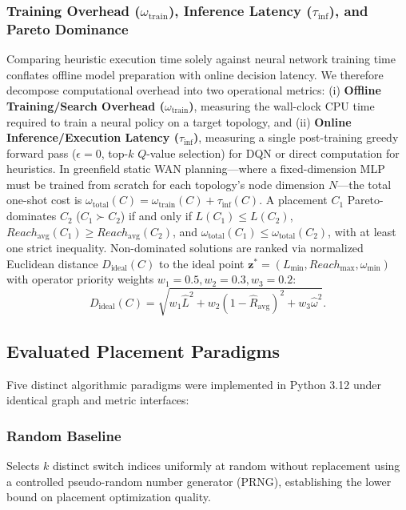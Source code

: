 \documentclass[conference]{IEEEtran}
\begin{document}
\subsubsection{Training Overhead ($\omega_{\text{train}}$), Inference Latency ($\tau_{\text{inf}}$), and Pareto Dominance}
Comparing heuristic execution time solely against neural network training time conflates offline model preparation with online decision latency. We therefore decompose computational overhead into two operational metrics: (i) \textbf{Offline Training/Search Overhead ($\omega_{\text{train}}$)}, measuring the wall-clock CPU time required to train a neural policy on a target topology, and (ii) \textbf{Online Inference/Execution Latency ($\tau_{\text{inf}}$)}, measuring a single post-training greedy forward pass ($\epsilon = 0$, top-$k$ $Q$-value selection) for DQN or direct computation for heuristics. In greenfield static WAN planning---where a fixed-dimension MLP must be trained from scratch for each topology's node dimension $N$---the total one-shot cost is $\omega_{\text{total}}(C) = \omega_{\text{train}}(C) + \tau_{\text{inf}}(C)$. A placement $C_1$ Pareto-dominates $C_2$ ($C_1 \succ C_2$) if and only if $L(C_1) \le L(C_2)$, $Reach_{\text{avg}}(C_1) \ge Reach_{\text{avg}}(C_2)$, and $\omega_{\text{total}}(C_1) \le \omega_{\text{total}}(C_2)$, with at least one strict inequality. Non-dominated solutions are ranked via normalized Euclidean distance $D_{\text{ideal}}(C)$ to the ideal point $\mathbf{z}^* = (L_{\min}, Reach_{\max}, \omega_{\min})$ with operator priority weights $w_1 = 0.5, w_2 = 0.3, w_3 = 0.2$:
\begin{equation}
D_{\text{ideal}}(C) = \sqrt{w_1 \hat{L}^2 + w_2 (1 - \hat{R}_{\text{avg}})^2 + w_3 \hat{\omega}^2}.
\label{eq:ideal}
\end{equation}

\subsection{Evaluated Placement Paradigms}
Five distinct algorithmic paradigms were implemented in Python 3.12 under identical graph and metric interfaces:

\subsubsection{Random Baseline}
Selects $k$ distinct switch indices uniformly at random without replacement using a controlled pseudo-random number generator (PRNG), establishing the lower bound on placement optimization quality.
\end{document}
